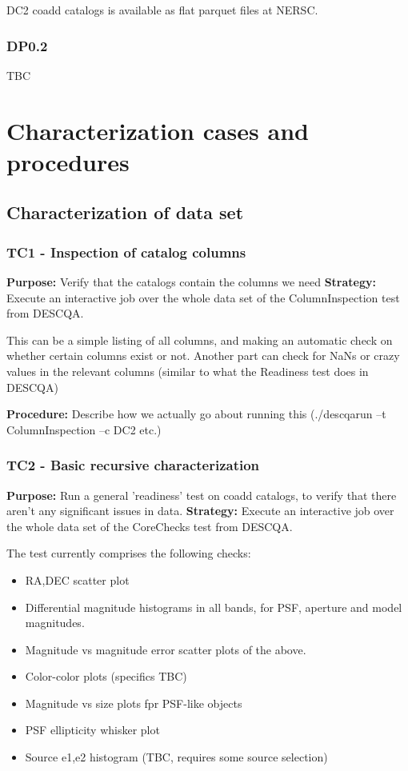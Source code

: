 \documentclass[12pt, a4paper]{article}
\begin{document}
DC2 coadd catalogs is available as flat parquet files at NERSC.

\subsubsection{DP0.2}

TBC


\section{Characterization cases and procedures}

\subsection{Characterization of data set}

\subsubsection{TC1 - Inspection of catalog columns}
\textbf{Purpose:} Verify that the catalogs contain the columns we need
\textbf{Strategy:} Execute an interactive job over the whole data set of the ColumnInspection test from DESCQA.

This can be a simple listing of all columns, and making an automatic check on whether certain columns exist or not. 
Another part can check for NaNs or crazy values in the relevant columns (similar to what the Readiness test does in DESCQA)

\textbf{Procedure:} Describe how we actually go about running this (./descqarun --t ColumnInspection --c DC2 etc.)

\subsubsection{TC2 - Basic recursive characterization}
\textbf{Purpose:} Run a general 'readiness' test on coadd catalogs, to verify that there aren't any significant issues in data. 
\textbf{Strategy:} Execute an interactive job over the whole data set of the CoreChecks test from DESCQA.

The test currently comprises the following checks:
\begin{itemize}
	\item RA,DEC scatter plot
	\item Differential magnitude histograms in all bands, for PSF, aperture and model magnitudes.
	\item Magnitude vs magnitude error scatter plots of the above.
	\item Color-color plots (specifics TBC)
	\item Magnitude vs size plots fpr PSF-like objects
	\item PSF ellipticity whisker plot
	\item Source e1,e2 histogram (TBC, requires some source selection)
\end{itemize}
\end{document}
